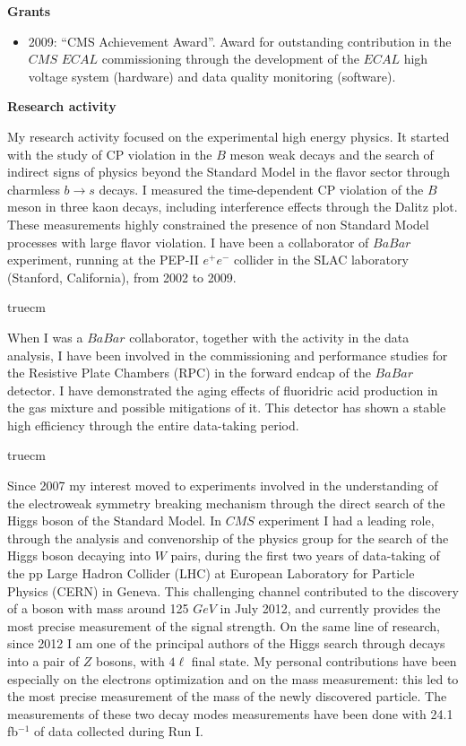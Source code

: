 \documentclass[11pt,twoside,a4paper]{article}
\begin{document}
\begin{center}
  {\bf{Grants}}
\end{center}

\begin{itemize}
\item 2009: ``CMS Achievement Award''. Award for outstanding
  contribution in the $CMS$ $ECAL$ commissioning through the development
  of the $ECAL$ high voltage system (hardware) and data quality
  monitoring (software).
\end{itemize}

\clearpage

\begin{center}
{\bf{Research activity}}
\end{center}
My research activity focused on the experimental high energy physics.
It started with the study of CP violation in the $B$ meson weak decays
and the search of indirect signs of physics beyond the Standard Model
in the flavor sector through charmless $b \to s$ decays. I measured
the time-dependent CP violation of the $B$ meson in three kaon decays,
including interference effects through the Dalitz plot. These
measurements highly constrained the presence of non Standard Model
processes with large flavor violation.  I have been a collaborator of
$BaBar$ experiment, running at the PEP-II $e^+e^-$ collider in the
SLAC laboratory (Stanford, California), from 2002 to 2009.

 truecm

When I was a $BaBar$ collaborator, together with the activity in the
data analysis, I have been involved in the commissioning and
performance studies for the Resistive Plate Chambers (RPC) in the
forward endcap of the $BaBar$ detector. I have demonstrated the aging
effects of fluoridric acid production in the gas mixture and possible
mitigations of it.  This detector has shown a stable high efficiency
through the entire data-taking period.

 truecm

Since 2007 my interest moved to experiments involved in the
understanding of the electroweak symmetry breaking mechanism through
the direct search of the Higgs boson of the Standard Model.  In $CMS$
experiment I had a leading role, through the analysis and convenorship
of the physics group for the search of the Higgs boson decaying into
$W$ pairs, during the first two years of data-taking of the pp Large
Hadron Collider (LHC) at European Laboratory for Particle Physics
(CERN) in Geneva.  This challenging channel contributed to the
discovery of a boson with mass around 125 $GeV$ in July 2012, and
currently provides the most precise measurement of the signal
strength.  On the same line of research, since 2012 I am one of the
principal authors of the Higgs search through decays into a pair of
$Z$ bosons, with $4\ell$ final state. My personal contributions have
been especially on the electrons optimization and on the mass
measurement: this led to the most precise measurement of the mass of
the newly discovered particle. The measurements of these two decay
modes measurements have been done with 24.1 fb$^{-1}$ of data
collected during Run I.
\end{document}
